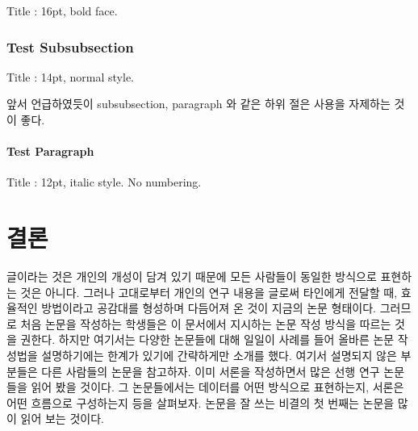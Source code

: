 \documentclass{gshs_thesis}
\begin{document}
Title : 16pt, bold face.

\subsubsection{Test Subsubsection}

Title : 14pt, normal style.

앞서 언급하였듯이 subsubsection, paragraph 와 같은 하위 절은 사용을 자제하는 것이 좋다.

\paragraph{Test Paragraph}

Title : 12pt, italic style. No numbering.


\section{결론}
글이라는 것은 개인의 개성이 담겨 있기 때문에 모든 사람들이 동일한 방식으로 표현하는 것은 아니다. 그러나 고대로부터 개인의 연구 내용을 글로써 타인에게 전달할 때, 효율적인 방법이라고 공감대를 형성하며 다듬어져 온 것이 지금의 논문 형태이다. 그러므로 처음 논문을 작성하는 학생들은 이 문서에서 지시하는 논문 작성 방식을 따르는 것을 권한다. 하지만 여기서는 다양한 논문들에 대해 일일이 사례를 들어 올바른 논문 작성법을 설명하기에는 한계가 있기에 간략하게만 소개를 했다. 여기서 설명되지 않은 부분들은 다른 사람들의 논문을 참고하자. 이미 서론을 작성하면서 많은 선행 연구 논문들을 읽어 봤을 것이다. 그 논문들에서는 데이터를 어떤 방식으로 표현하는지, 서론은 어떤 흐름으로 구성하는지 등을 살펴보자. 논문을 잘 쓰는 비결의 첫 번째는 논문을 많이 읽어 보는 것이다.
\end{document}
